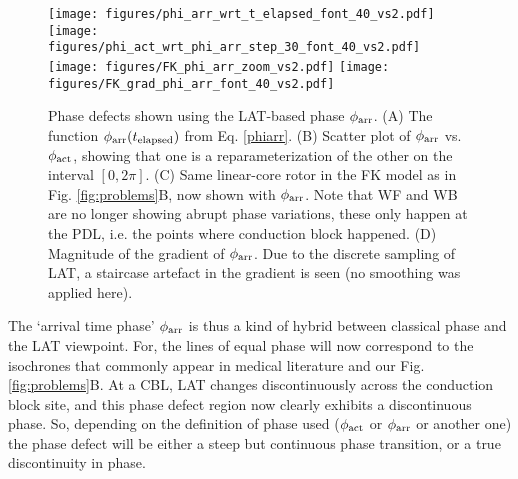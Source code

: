 \documentclass{article}
\newcommand{\phiact}{\ensuremath{\phi_{\rm act}}}
\newcommand{\phiarr}{\ensuremath{\phi_{\rm arr}}}
\newcommand{\tlap}{\ensuremath{t_{\rm elapsed}}}
\begin{document}
\begin{figure}
    \centering
{}    \texttt{[image: figures/phi\_arr\_wrt\_t\_elapsed\_font\_40\_vs2.pdf]}
    \texttt{[image: figures/phi\_act\_wrt\_phi\_arr\_step\_30\_font\_40\_vs2.pdf]} \\
    \texttt{[image: figures/FK\_phi\_arr\_zoom\_vs2.pdf]}
    \texttt{[image: figures/FK\_grad\_phi\_arr\_font\_40\_vs2.pdf]}
     \caption{Phase defects shown using the LAT-based phase $\phiarr$. (A) The function $\phiarr(\tlap)$ from Eq. \eqref{phiarr}. (B) Scatter plot of $\phiarr$ vs. $\phiact$, showing that one is a reparameterization of the other on the interval $[0, 2\pi]$. (C) Same linear-core rotor in the FK model as in Fig. \ref{fig:problems}B, now shown with $\phiarr$. Note that WF and WB are no longer showing abrupt phase variations, these only happen at the PDL, i.e. the points where conduction block happened. (D) Magnitude of the gradient of $\phiarr$. Due to the discrete sampling of LAT, a staircase artefact in the gradient is seen (no smoothing was applied here). 
    }
    \label{fig:phiarr}
\end{figure}

The `arrival time phase' $\phiarr$ is thus a kind of hybrid between classical phase and the LAT viewpoint. For, the lines of equal phase will now correspond to the isochrones that commonly appear in medical literature and our Fig. \ref{fig:problems}B. At a CBL, LAT changes discontinuously across the conduction block site, and this phase defect region now clearly exhibits a discontinuous phase. So, depending on the definition of phase used ($\phiact$ or $\phiarr$ or another one) the phase defect will be either a steep but continuous phase transition, or a true discontinuity in phase. 
\end{document}
